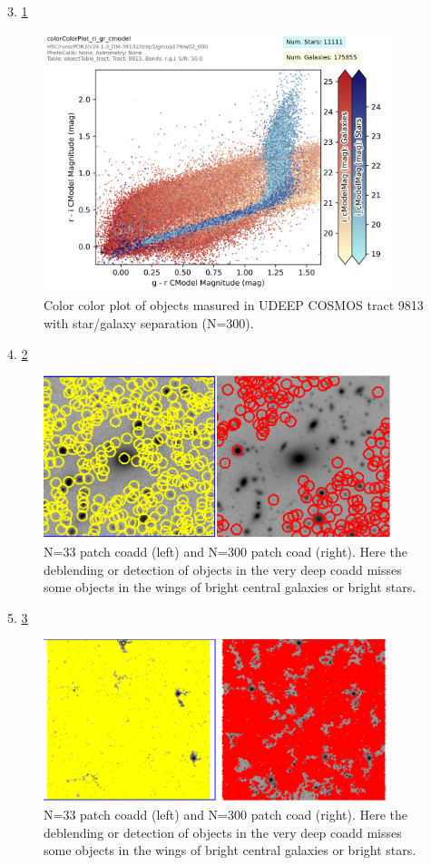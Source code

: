 3. \ref{fig:colorcolor}

 \begin{figure}[h]
 \includegraphics[width=0.9\textwidth]{colorColor9813.png}
	 \caption{Color color plot of objects masured in UDEEP COSMOS tract 9813 with star/galaxy separation (N=300).  \label{fig:colorcolor}}
 \end{figure}

4. \ref{fig:deblend1}

 \begin{figure}[h]
 \includegraphics[width=0.9\textwidth]{wobjects.png}
	 \caption{N=33 patch coadd (left) and N=300 patch coad (right).  Here the deblending or detection of objects in the very deep coadd misses some objects in the wings of bright central galaxies or bright stars.  \label{fig:deblend1}}
 \end{figure}

5. \ref{fig:deblend2}

 \begin{figure}[h]
 \includegraphics[width=0.9\textwidth]{full.png}
	 \caption{N=33 patch coadd (left) and N=300 patch coad (right).  Here the deblending or detection of objects in the very deep coadd misses some objects in the wings of bright central galaxies or bright stars.  \label{fig:deblend2}}
 \end{figure}

